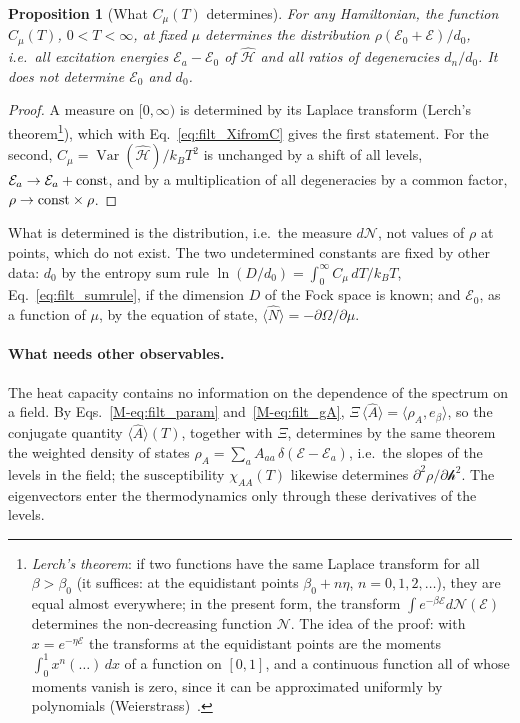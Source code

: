 \documentclass[10pt,a4paper]{article}
\theoremstyle{plain}
\newtheorem{proposition}{Proposition}
\theoremstyle{remark}
\newcommand{\Var}{\operatorname{Var}}
\newcommand{\cN}{\mathcal{N}}   %
\newcommand{\cE}{\mathcal{E}}   %
\newcommand{\hfield}{\mathscr{h}}  %
\newcommand{\enrg}{\mathcal{E}}  %
\begin{document}
\begin{proposition}[What $C_\mu(T)$ determines]\label{prop:invert}
For any Hamiltonian, the function $C_\mu(T)$, $0<T<\infty$, at fixed $\mu$
determines the distribution $\rho(\enrg_0+\cE)/d_0$, i.e.\ all excitation
energies $\enrg_a-\enrg_0$ of $\hat{\mathcal H}$ and all ratios of degeneracies
$d_n/d_0$. It does not determine $\enrg_0$ and $d_0$.
\end{proposition}
\begin{proof}
A measure on $[0,\infty)$ is determined by its Laplace transform (Lerch's
theorem\footnote{\emph{Lerch's theorem}: if two functions have the same
Laplace transform for all $\beta>\beta_0$ (it suffices: at the equidistant
points $\beta_0+n\eta$, $n=0,1,2,\dots$), they are equal almost everywhere;
in the present form, the transform $\int e^{-\beta\cE}d\cN(\cE)$ determines
the non-decreasing function $\cN$. The idea of the proof: with
$x=e^{-\eta\cE}$ the transforms at the equidistant points are the moments
$\int_0^1x^{n}(\dots)\,dx$ of a function on $[0,1]$, and a continuous
function all of whose moments vanish is zero, since it can be approximated
uniformly by polynomials (Weierstrass)~\cite{Widder}.}), which with
Eq.~\eqref{eq:filt_XifromC} gives the first statement. For the second,
$C_\mu=\Var(\hat{\mathcal H})/k_BT^{2}$ is unchanged by a shift of all
levels, $\enrg_a\to\enrg_a+{\rm const}$, and by a multiplication of all
degeneracies by a common factor, $\rho\to{\rm const}\times \rho$.
\end{proof}
What is determined is the distribution, i.e.\ the measure $d\cN$, not values
of $\rho$ at points, which do not exist. The two undetermined constants are
fixed by other data: $d_0$ by the entropy sum rule
$\ln(D/d_0)=\int_0^\infty C_\mu\,dT/k_BT$, Eq.~\eqref{eq:filt_sumrule}, if the
dimension $D$ of the Fock space is known; and $\enrg_0$, as a function of
$\mu$, by the equation of state, $\langle\hat N\rangle=-\partial\Omega/\partial\mu$.

\paragraph{What needs other observables.} The heat capacity contains no
information on the dependence of the spectrum on a field. By
Eqs.~\eqref{M-eq:filt_param} and~\eqref{M-eq:filt_gA},
$\Xi\,\langle\hat A\rangle=\langle \rho_A,e_\beta\rangle$, so the conjugate
quantity $\langle\hat A\rangle(T)$, together with $\Xi$, determines by the
same theorem the weighted density of states
$\rho_A=\sum_aA_{aa}\,\delta(\enrg-\enrg_a)$, i.e.\ the slopes of the levels in the
field; the susceptibility $\chi_{AA}(T)$ likewise determines
$\partial^{2}\rho/\partial \hfield^{2}$. The eigenvectors enter the thermodynamics
only through these derivatives of the levels.
\end{document}

